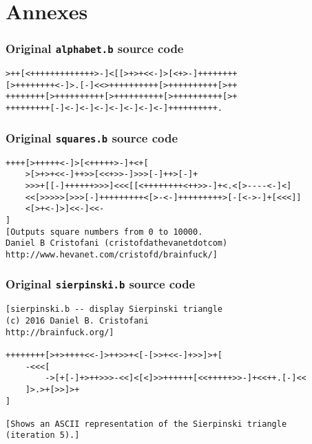 \clearpage

\chapter{Annexes}
\label{chap:ch6}

\label{chap:alphabetannex}
\subsection*{Original \texttt{alphabet.b} source code}

\begin{verbatim}
>++[<+++++++++++++>-]<[[>+>+<<-]>[<+>-]++++++++
[>++++++++<-]>.[-]<<>++++++++++[>++++++++++[>++
++++++++[>++++++++++[>++++++++++[>++++++++++[>+
+++++++++[-]<-]<-]<-]<-]<-]<-]<-]++++++++++.
\end{verbatim}

\label{chap:squaresannex}
\subsection*{Original \texttt{squares.b} source code}

\begin{verbatim}
++++[>+++++<-]>[<+++++>-]+<+[
    >[>+>+<<-]++>>[<<+>>-]>>>[-]++>[-]+
    >>>+[[-]++++++>>>]<<<[[<++++++++<++>>-]+<.<[>----<-]<]
    <<[>>>>>[>>>[-]+++++++++<[>-<-]+++++++++>[-[<->-]+[<<<]]
    <[>+<-]>]<<-]<<-
]
[Outputs square numbers from 0 to 10000.
Daniel B Cristofani (cristofdathevanetdotcom)
http://www.hevanet.com/cristofd/brainfuck/]
\end{verbatim}

\label{chap:sierpinskiannex}
\subsection*{Original \texttt{sierpinski.b} source code}

\begin{verbatim}
[sierpinski.b -- display Sierpinski triangle
(c) 2016 Daniel B. Cristofani
http://brainfuck.org/]

++++++++[>+>++++<<-]>++>>+<[-[>>+<<-]+>>]>+[
    -<<<[
        ->[+[-]+>++>>>-<<]<[<]>>++++++[<<+++++>>-]+<<++.[-]<<
    ]>.>+[>>]>+
]

[Shows an ASCII representation of the Sierpinski triangle
(iteration 5).]
\end{verbatim}